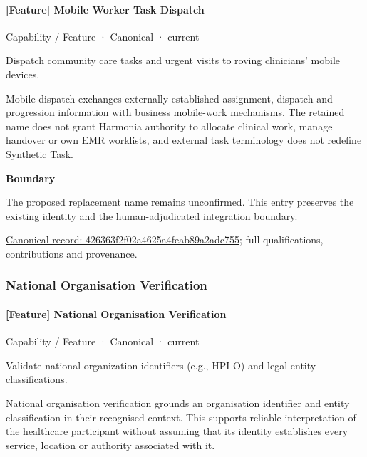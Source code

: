 \paragraph{[Feature] Mobile Worker Task Dispatch}

\label{element:426363f2f02a4625a4feab89a2adc755}
{\small Capability / Feature · Canonical · current}\par

Dispatch community care tasks and urgent visits to roving clinicians' mobile devices.



Mobile dispatch exchanges externally established assignment, dispatch and progression information with business mobile-work mechanisms. The retained name does not grant Harmonia authority to allocate clinical work, manage handover or own EMR worklists, and external task terminology does not redefine Synthetic Task.



\textbf{Boundary}



The proposed replacement name remains unconfirmed. This entry preserves the existing identity and the human-adjudicated integration boundary.


{\footnotesize \href{../../../../continuum/strategy/capability/feature/426363f2f02a4625a4feab89a2adc755.md}{Canonical record: 426363f2f02a4625a4feab89a2adc755}; full qualifications, contributions and provenance.}\par
\subsubsection{National Organisation Verification}

\paragraph{[Feature] National Organisation Verification}

\label{element:0f17fe5439fe45dc8f4edbff3cca0776}
{\small Capability / Feature · Canonical · current}\par

Validate national organization identifiers (e.g., HPI-O) and legal entity classifications.



National organisation verification grounds an organisation identifier and entity classification in their recognised context. This supports reliable interpretation of the healthcare participant without assuming that its identity establishes every service, location or authority associated with it.


